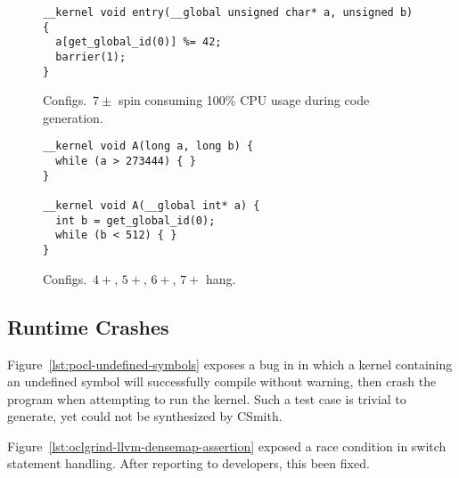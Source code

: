 \begin{figure}
\begin{lstlisting}
__kernel void entry(__global unsigned char* a, unsigned b) {
  a[get_global_id(0)] %= 42;
  barrier(1);
}
\end{lstlisting}
\caption{Configs.\ $7\pm$ spin consuming 100\% CPU usage during code generation.}
\end{figure}

%	

\begin{figure}
\begin{lstlisting}
__kernel void A(long a, long b) {
  while (a > 273444) { }
}

__kernel void A(__global int* a) {
  int b = get_global_id(0);
  while (b < 512) { }
}
\end{lstlisting}
\caption{Configs.\ $4+$, $5+$, $6+$, $7+$ hang.}
\end{figure}

\subsection{Runtime Crashes}

Figure~\ref{lst:pocl-undefined-symbols} exposes a bug in in which a kernel containing an undefined symbol will successfully compile without warning, then crash the program when attempting to run the kernel. Such a test case is trivial to generate, yet could not be synthesized by CSmith.

Figure~\ref{lst:oclgrind-llvm-densemap-assertion} exposed a race condition in switch statement handling. After reporting to developers, this been fixed.

